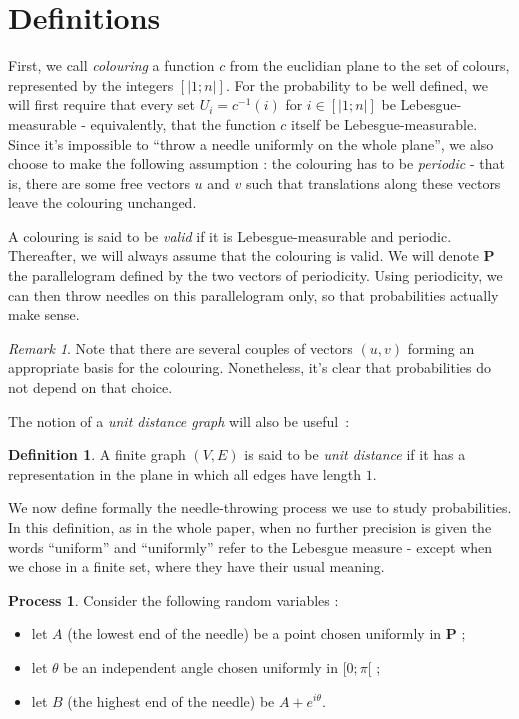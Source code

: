 \documentclass[a4paper,11pt]{article}
\theoremstyle{definition}
\newtheorem{definition}{Definition}
\newtheorem{process}{Process}
\theoremstyle{remark}
\newtheorem{remark}{Remark}
\begin{document}
\section{Definitions}
\label{def}
First, we call \emph{colouring} a function $c$ from the euclidian plane to the 
set of colours, represented by the integers $ [| 1 ; n |]$. For the probability 
to be well defined, we will 
first require that every set $U_i = c^{-1}(i)$ for $i \in [| 1 ; n |]$ be 
Lebesgue-measurable - equivalently, that the function $c$ itself be 
Lebesgue-measurable. Since it's impossible to ``throw a needle uniformly on the 
whole plane'', we also choose to make the following assumption : 
the colouring has to be \textit{periodic} - that is, there are some free vectors 
$u$ and $v$ such that translations along these vectors leave the colouring 
unchanged.

A colouring is said to be \emph{valid} if it is Lebesgue-measurable and 
periodic. Thereafter, we 
will always assume that the colouring is valid. We will denote $\mathbf{P}$ the 
parallelogram defined by the two vectors of periodicity. Using periodicity, 
we can then throw needles on this parallelogram only, so 
that probabilities actually make sense.
\begin{remark}
Note that there are several couples of vectors $(u, v)$ forming an appropriate 
basis for the colouring. Nonetheless, it's clear that probabilities do not 
depend on that choice. 
\end{remark}

The notion of a \emph{unit distance graph} will also be useful~:
\begin{definition}

A finite graph $(V, E) $ is said to be \emph{unit distance} if it has a 
representation in the plane in which all edges have length $1$.
\end{definition}

We now define formally the needle-throwing process we use to study probabilities. 
In this definition, as in the whole paper, when no further precision 
is given the words ``uniform'' and ``uniformly'' refer to the Lebesgue measure -
except when we chose in a finite set, where they have their usual meaning.
\begin{process}
Consider the following random variables :
\begin{itemize}
  \item let $A$ (the lowest end of the needle) be a point chosen uniformly 
  in $\mathbf{P}$ ;
  \item let $\theta$ be an independent angle chosen uniformly in $[0;\pi[$ ;
  \item let $B$ (the highest end of the needle) be $A + e^{i \theta}$.
\end{itemize}
\end{process}
\end{document}

